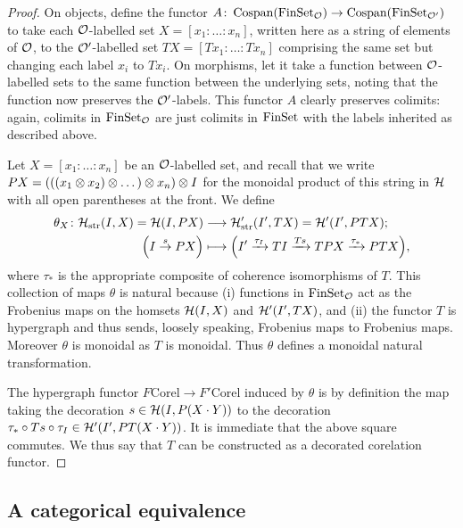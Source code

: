 \begin{proof}
  On objects, define the functor $A{\colon} \operatorname{{Cospan}}(\mathrm{FinSet}_{\mathcal O}) \to
  \operatorname{{Cospan}}(\mathrm{FinSet}_{\mathcal O'})$ to take each $\mathcal O$-labelled set $X=[x_1:\ldots:x_n]$,
  written here as a string of elements of $\mathcal O$, to the $\mathcal O'$-labelled set
  $TX=[Tx_1:\ldots:Tx_n]$ comprising the same set but changing each label $x_i$ to
  $Tx_i$. On morphisms, let it take a function between $\mathcal O$-labelled sets to
  the same function between the underlying sets, noting that the function now
  preserves the $\mathcal O'$-labels. This functor $A$ clearly preserves colimits:
  again, colimits in $\mathrm{FinSet}_{\mathcal O}$ are just colimits in $\mathrm{FinSet}$ with the
  labels inherited as described above.

  Let $X=[x_1:\ldots:x_n]$ be an $\mathcal O$-labelled set, and recall that we write
  $PX= (((x_1\otimes x_2) \otimes \dots )\otimes x_n) \otimes I$ for the monoidal product of
  this string in $\mathcal H$ with all open parentheses at the front. We define
  \begin{align*}
    \theta_X{\colon} \mathcal H_{\mathrm{str}}(I,X) = \mathcal H(I,PX) &\longrightarrow \mathcal
    H'_{\mathrm{str}}(I', TX)= \mathcal H'(I',PTX); \\
    \Big(I \stackrel{s}\to PX\Big) &\longmapsto \Big(I' \xrightarrow{\tau_I} TI
    \xrightarrow{Ts} TPX \xrightarrow{\tau_\ast} PTX\Big), 
  \end{align*}
  where $\tau_\ast$ is the appropriate composite of coherence isomorphisms of
  $T$. This collection of maps $\theta$ is natural because (i) functions in
  $\mathrm{FinSet}_{\mathcal O}$ act as the Frobenius maps on the homsets $\mathcal H(I,X)$ and
  $\mathcal H'(I',TX)$, and (ii) the functor $T$ is hypergraph and thus sends,
  loosely speaking, Frobenius maps to Frobenius maps. Moreover $\theta$ is
  monoidal as $T$ is monoidal.  Thus $\theta$ defines a monoidal natural
  transformation.

  The hypergraph functor $F\mathrm{Corel} \to F'\mathrm{Corel}$ induced by
  $\theta$ is by definition the map taking the decoration $s \in \mathcal
  H(I,P(X\cdot Y))$ to the decoration $\tau_\ast \circ Ts \circ
  \tau_I \in \mathcal H'(I',PT(X \cdot Y))$. It is immediate that the above square
  commutes. We thus say that $T$ can be constructed as a decorated corelation
  functor.
\end{proof}

\subsection{A categorical equivalence}

